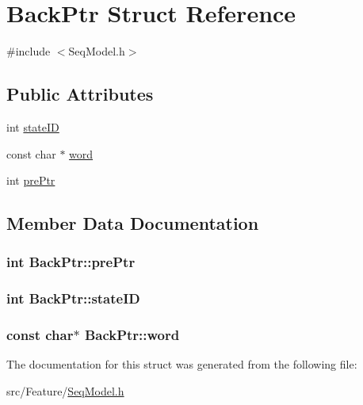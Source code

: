 \hypertarget{struct_back_ptr}{\section{Back\+Ptr Struct Reference}
\label{struct_back_ptr}
}


{\ttfamily \#include $<$Seq\+Model.\+h$>$}

\subsection*{Public Attributes}
\begin{DoxyCompactItemize}
\item 
int \hyperlink{struct_back_ptr_a2adab93b217084150a956bf9c28e48a8}{state\+I\+D}
\item 
const char $\ast$ \hyperlink{struct_back_ptr_ab6ca867e253d7cfb09944b6e248af63a}{word}
\item 
int \hyperlink{struct_back_ptr_a6465b7c1e40c878c73dbba8fc7f5561f}{pre\+Ptr}
\end{DoxyCompactItemize}


\subsection{Member Data Documentation}
\hypertarget{struct_back_ptr_a6465b7c1e40c878c73dbba8fc7f5561f}{
\subsubsection[{pre\+Ptr}]{\setlength{\rightskip}{0pt plus 5cm}int Back\+Ptr\+::pre\+Ptr}}\label{struct_back_ptr_a6465b7c1e40c878c73dbba8fc7f5561f}
\hypertarget{struct_back_ptr_a2adab93b217084150a956bf9c28e48a8}{
\subsubsection[{state\+I\+D}]{\setlength{\rightskip}{0pt plus 5cm}int Back\+Ptr\+::state\+I\+D}}\label{struct_back_ptr_a2adab93b217084150a956bf9c28e48a8}
\hypertarget{struct_back_ptr_ab6ca867e253d7cfb09944b6e248af63a}{
\subsubsection[{word}]{\setlength{\rightskip}{0pt plus 5cm}const char$\ast$ Back\+Ptr\+::word}}\label{struct_back_ptr_ab6ca867e253d7cfb09944b6e248af63a}


The documentation for this struct was generated from the following file\+:\begin{DoxyCompactItemize}
\item 
src/\+Feature/\hyperlink{_seq_model_8h}{Seq\+Model.\+h}\end{DoxyCompactItemize}

